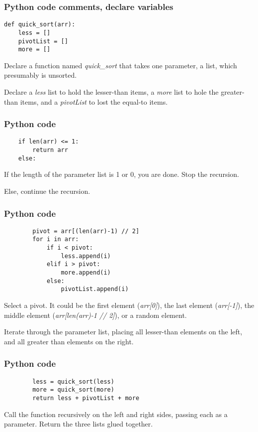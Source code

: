 \documentclass{beamer}
\begin{document}
    \begin{frame}[fragile]
        \frametitle{Python code comments, declare variables}
        \begin{verbatim}
def quick_sort(arr):
    less = []
    pivotList = []
    more = []
        \end{verbatim}
        \par Declare a function named \textit{quick\_sort} that takes one parameter, a list, which presumably is unsorted.
        \par Declare a \textit{less} list to hold the lesser-than items, a \textit{more} list to hole the greater-than items, and a \textit{pivotList} to lost the equal-to items.
    \end{frame}

    \begin{frame}[fragile]
        \frametitle{Python code}
        \footnotesize
        \begin{verbatim}
    if len(arr) <= 1:
        return arr
    else:
        \end{verbatim}
        \par If the length of the parameter list is 1 or 0, you are done. Stop the recursion.
        \par Else, continue the recursion.
    \end{frame}

    \begin{frame}[fragile]
        \frametitle{Python code}
        \footnotesize
        \begin{verbatim}
        pivot = arr[(len(arr)-1) // 2]
        for i in arr:
            if i < pivot:           
                less.append(i)
            elif i > pivot:
                more.append(i)
            else:
                pivotList.append(i)
        \end{verbatim}
        \par Select a pivot. It could be the first element (\textit{arr[0]}), the last element (\textit{arr[-1]}), the middle element (\textit{arr[len(arr)-1 // 2]}), or a random element.
        \par Iterate through the parameter list, placing all lesser-than elements on the left, and all greater than elements on the right.
    \end{frame}

    \begin{frame}[fragile]
        \frametitle{Python code}
        \footnotesize
        \begin{verbatim}
        less = quick_sort(less)
        more = quick_sort(more)
        return less + pivotList + more
        \end{verbatim}
        \par Call the function recursively on the left and right sides, passing each as a parameter. Return the three lists glued together.
    \end{frame}
\end{document}
